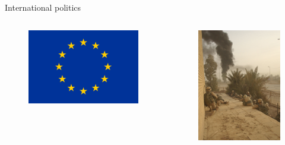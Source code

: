 \documentclass{beamer}
\begin{document}
\begin{frame}{International politics}
\begin{columns}
\begin{figure}
    \centering
    \includegraphics[width=\textwidth]{../img/EU.png}
\end{figure}
\begin{figure}
    \centering
    \includegraphics[width=\textwidth]{../img/USinvasion.jpg}
\end{figure}
\end{columns}
\end{frame}{}
\end{document}
